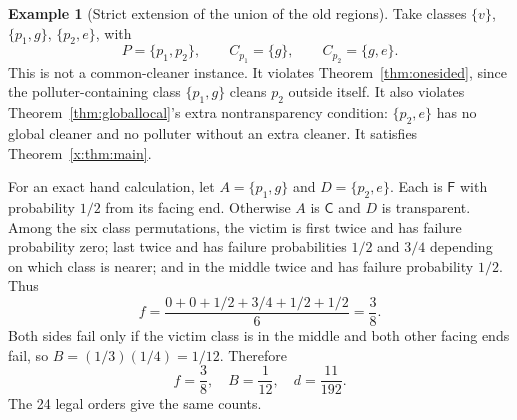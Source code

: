 \documentclass[11pt,a4paper]{article}
\theoremstyle{definition}\newtheorem{definition}[theorem]{Definition}
\theoremstyle{remark}\newtheorem{remark}[theorem]{Remark}
\theoremstyle{definition}\newtheorem{xexample}[xtheorem]{Example}\theoremstyle{plain}
\newcommand{\Fail}{\mathsf F}\newcommand{\Clean}{\mathsf C}\newcommand{\Und}{\mathsf U}
\begin{document}
\begin{xexample}[Strict extension of the union of the old regions]\label{x:ex:strict}
Take classes $\{v\}$, $\{p_1,g\}$, $\{p_2,e\}$, with
\[
P=\{p_1,p_2\},\qquad C_{p_1}=\{g\},\qquad C_{p_2}=\{g,e\}.
\]
This is not a common-cleaner instance. It violates Theorem~\ref{thm:onesided}, since the polluter-containing class $\{p_1,g\}$ cleans $p_2$ outside itself. It also violates Theorem~\ref{thm:globallocal}'s extra nontransparency condition: $\{p_2,e\}$ has no global cleaner and no polluter without an extra cleaner. It satisfies Theorem~\ref{x:thm:main}.

For an exact hand calculation, let $A=\{p_1,g\}$ and $D=\{p_2,e\}$. Each is $\Fail$ with probability $1/2$ from its facing end. Otherwise $A$ is $\Clean$ and $D$ is transparent. Among the six class permutations, the victim is first twice and has failure probability zero; last twice and has failure probabilities $1/2$ and $3/4$ depending on which class is nearer; and in the middle twice and has failure probability $1/2$. Thus
\[
f=\frac{0+0+1/2+3/4+1/2+1/2}{6}=\frac38.
\]
Both sides fail only if the victim class is in the middle and both other facing ends fail, so $B=(1/3)(1/4)=1/12$. Therefore
\[
\boxed{f=\frac38,\quad B=\frac1{12},\quad d=\frac{11}{192}.}
\]
The 24 legal orders give the same counts.
\end{xexample}
\end{document}
